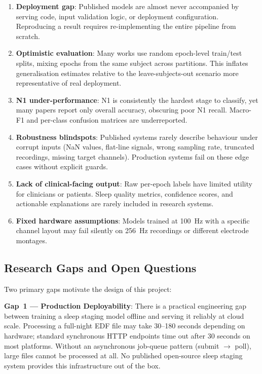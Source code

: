 \documentclass[10pt]{article}
\begin{document}
\begin{enumerate}
  \item \textbf{Deployment gap}: Published models are almost never accompanied by serving code, input validation logic, or deployment configuration. Reproducing a result requires re-implementing the entire pipeline from scratch.
  \item \textbf{Optimistic evaluation}: Many works use random epoch-level train/test splits, mixing epochs from the same subject across partitions. This inflates generalisation estimates relative to the leave-subjects-out scenario more representative of real deployment.
  \item \textbf{N1 under-performance}: N1 is consistently the hardest stage to classify, yet many papers report only overall accuracy, obscuring poor N1 recall. Macro-F1 and per-class confusion matrices are underreported.
  \item \textbf{Robustness blindspots}: Published systems rarely describe behaviour under corrupt inputs (NaN values, flat-line signals, wrong sampling rate, truncated recordings, missing target channels). Production systems fail on these edge cases without explicit guards.
  \item \textbf{Lack of clinical-facing output}: Raw per-epoch labels have limited utility for clinicians or patients. Sleep quality metrics, confidence scores, and actionable explanations are rarely included in research systems.
  \item \textbf{Fixed hardware assumptions}: Models trained at 100~Hz with a specific channel layout may fail silently on 256~Hz recordings or different electrode montages.
\end{enumerate}

\subsection{Research Gaps and Open Questions}
\label{sec:gaps}

Two primary gaps motivate the design of this project:

\textbf{Gap~1 --- Production Deployability}: There is a practical engineering gap between training a sleep staging model offline and serving it reliably at cloud scale. Processing a full-night EDF file may take 30--180 seconds depending on hardware; standard synchronous HTTP endpoints time out after 30 seconds on most platforms. Without an asynchronous job-queue pattern (submit $\rightarrow$ poll), large files cannot be processed at all. No published open-source sleep staging system provides this infrastructure out of the box.
\end{document}
